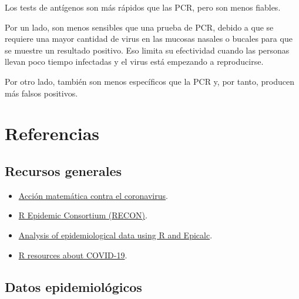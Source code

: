 \documentclass[
  spanish,
  a4paper,
]{scrreport}
\providecommand{\tightlist}{%
  \setlength{\itemsep}{0pt}\setlength{\parskip}{0pt}}
\theoremstyle{definition}
\theoremstyle{definition}
\theoremstyle{remark}
\begin{document}
Los tests de antígenos son más rápidos que las PCR, pero son menos
fiables.

Por un lado, son menos sensibles que una prueba de PCR, debido a que se
requiere una mayor cantidad de virus en las mucosas nasales o bucales
para que se muestre un resultado positivo. Eso limita su efectividad
cuando las personas llevan poco tiempo infectadas y el virus está
empezando a reproducirse.

Por otro lado, también son menos específicos que la PCR y, por tanto,
producen más falsos positivos.

\cleardoublepage
{}
{}
\appendix

\chapter*{Referencias}\label{sec-referencias}


\section*{Recursos generales}\label{recursos-generales}


\begin{itemize}
\tightlist
\item
  \href{http://matematicas.uclm.es/cemat/covid19/}{Acción matemática
  contra el coronavirus}.
\item
  \href{https://www.repidemicsconsortium.org/}{R Epidemic Consortium
  (RECON)}.
\item
  \href{https://cran.r-project.org/doc/contrib/Epicalc_Book.pdf}{Analysis
  of epidemiological data using R and Epicalc}.
\item
  \href{https://statsandr.com/blog/top-r-resources-on-covid-19-coronavirus/\#coronavirus}{R
  resources about COVID-19}.
\end{itemize}

\section*{Datos epidemiológicos}\label{datos-epidemioluxf3gicos}

\end{document}
